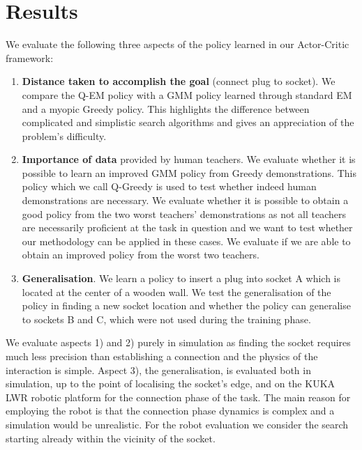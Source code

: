 \FloatBarrier
\section{Results}\label{ch4:results}

We evaluate the following three aspects of the policy learned in our Actor-Critic framework:
\begin{enumerate}
 \item \textbf{Distance taken to accomplish the goal} (connect plug to socket). We compare the Q-EM policy with 
 a GMM policy learned through standard EM and a myopic Greedy policy. This highlights the difference between complicated and simplistic  
  search algorithms and gives an appreciation of the problem's difficulty.
 \item \textbf{Importance of data} provided by human teachers. We evaluate whether it is possible to learn 
 an improved GMM policy from Greedy demonstrations. This policy which we call Q-Greedy is used to test whether 
 indeed human demonstrations are necessary.
 We evaluate whether it is possible to obtain a good policy from the two worst teachers' demonstrations as not all teachers 
 are necessarily proficient at the task in question and we want to test whether our methodology can be applied in these
 cases. We evaluate if we  are able to obtain an improved policy from the worst two teachers.
 \item \textbf{Generalisation}. We learn a policy to insert a plug into socket A which is located at the center of a wooden 
 wall. We test the generalisation of the policy in finding a new socket location and whether the policy can generalise to sockets 
 B and C, which were not used during the training phase.
\end{enumerate}

We evaluate aspects 1) and 2) purely in simulation as finding the socket requires much less precision than establishing a 
connection and the physics of the interaction is simple. Aspect 3), the generalisation, is evaluated both in simulation,
up to the point of localising the socket's edge, and on the KUKA LWR robotic platform
for the connection phase of the task. The main reason for employing the robot is that the connection phase dynamics is 
complex and a simulation would be unrealistic. For the robot evaluation we consider 
the search starting already within the vicinity of the socket.



